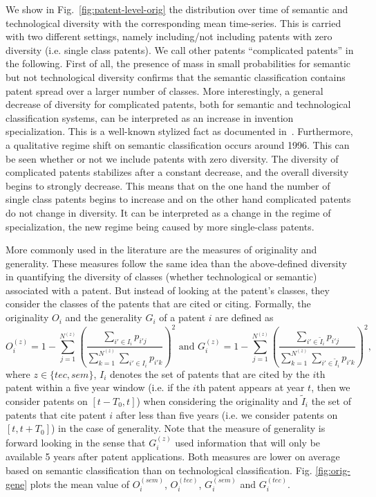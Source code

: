\documentclass[12pt,twoside,a4paper]{article}
\begin{document}
We show in Fig.~\ref{fig:patent-level-orig} the distribution over time of semantic and technological diversity with the corresponding mean time-series. This is carried with two different settings, namely including/not including patents with zero diversity (i.e. single class patents). We call other patents ``complicated patents'' in the following. First of all, the presence of mass in small probabilities for semantic but not technological diversity confirms that the semantic classification contains patent spread over a larger number of classes. More interestingly, a general decrease of diversity for complicated patents, both for semantic and technological classification systems, can be interpreted as an increase in invention specialization. This is a well-known stylized fact as documented in~\cite{ARCHIBUGI199279}. Furthermore, a qualitative regime shift on semantic classification occurs around 1996. This can be seen whether or not we include patents with zero diversity. The diversity of complicated patents stabilizes after a constant decrease, and the overall diversity begins to strongly decrease. This means that on the one hand the number of single class patents begins to increase and on the other hand complicated patents do not change in diversity. It can be interpreted as a change in the regime of specialization, the new regime being caused by more single-class patents.

More commonly used in the literature are the measures of originality and generality. These measures follow the same idea than the above-defined diversity in quantifying the diversity of classes (whether technological or semantic) associated with a patent. But instead of looking at the patent's classes, they consider the classes of the patents that are cited or citing. Formally, the originality $O_i$ and the generality $G_i$ of a patent $i$ are defined as
\[
O_i^{(z)} = \displaystyle 1 - \sum_{j =1}^{N^{(z)}}{\left(\frac{\displaystyle \sum_{i' \in I_i}{p_{i'j}}}{\displaystyle \sum_{k =1}^{N^{(z)}}{\displaystyle \sum_{i' \in I_i}{p_{i'k}}}}\right)^2} \text{ and } G_i^{(z)} = \displaystyle 1 - \sum_{j =1}^{N^{(z)}}{\left(\frac{\displaystyle \sum_{i' \in \tilde{I}_i}{p_{i'j}}}{\displaystyle \sum_{k =1}^{N^{(z)}}{\displaystyle \sum_{i' \in \tilde{I}_i}{p_{i'k}}}}\right)^2}, 
\]
where $z \in \{tec, sem\}$, $I_i$ denotes the set of patents that are cited by the $i$th patent within a five year window (i.e. if the $i$th patent appears at year $t$, then we consider patents on $[t-T_0, t]$) when considering the originality and $\tilde{I}_i$ the set of patents that cite patent $i$ after less than five years (i.e. we consider patents on $[t ,t + T_0]$) in the case of generality. Note that the measure of generality is forward looking in the sense that $G_i^{(z)}$ used information that will only be available 5 years after patent applications. Both measures are lower on average based on semantic classification than on technological classification. Fig. \ref{fig:orig-gene} plots the mean value of $O_i^{(sem)}$, $O_i^{(tec)}$, $G_i^{(sem)}$ and $G_i^{(tec)}$.
\end{document}
